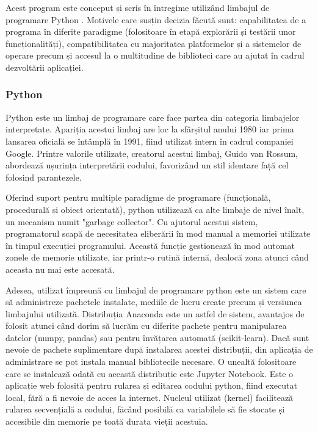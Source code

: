 \documentclass[a4paper, 12pt]{report}
\begin{document}
	Acest program este conceput și scris în întregime utilizând limbajul de programare Python \cite{python}. Motivele care susțin decizia făcută sunt: capabilitatea de a programa în diferite paradigme (folositoare în etapă explorării și testării unor funcționalități), compatibilitatea cu majoritatea platformelor și a sistemelor de operare precum și accesul la o multitudine de biblioteci care au ajutat în cadrul dezvoltării aplicației.
	
	\clearpage
	\subsubsection{Python}
	Python este un limbaj de programare care face partea din categoria limbajelor interpretate. Apariția acestui limbaj are loc la sfârșitul anului 1980 iar prima lansarea oficială se întâmplă în 1991, fiind utilizat intern în cadrul companiei Google. Printre valorile utilizate, creatorul acestui limbaj, Guido van Rossum, abordează ușurința interpretării codului, favorizând un stil identare față cel folosind parantezele.

	Oferind suport pentru multiple paradigme de programare (funcțională, procedurală și obiect orientată), python utilizează ca alte limbaje de nivel înalt, un mecanism numit "garbage collector". Cu ajutorul acestui sistem, programatorul scapă de necesitatea eliberării în mod manual a memoriei utilizate în timpul execuției programului. Această funcție gestionează în mod automat zonele de memorie utilizate, iar printr-o rutină internă, dealocă zona atunci când aceasta nu mai este accesată. 

	Adesea, utilizat împreună cu limbajul de programare python este un sistem care să administreze pachetele instalate, mediile de lucru create precum și versiunea limbajului utilizată. Distribuția Anaconda \cite{anaconda} este un astfel de sistem, avantajos de folosit atunci când dorim să lucrăm cu diferite pachete pentru manipularea datelor (numpy, pandas) sau pentru învățarea automată (scikit-learn). Dacă sunt nevoie de pachete suplimentare după instalarea acestei distribuții, din aplicația de administrare se pot instala manual bibliotecile necesare. O unealtă folositoare care se instalează odată cu această distribuție este Jupyter Notebook. Este o aplicație web folosită pentru rularea și editarea codului python, fiind executat local, fără a fi nevoie de acces la internet. Nucleul utilizat (kernel) facilitează rularea secvențială a codului, făcând posibilă ca variabilele să fie stocate și accesibile din memorie pe toată durata vieții acestuia. 
	
\end{document}
